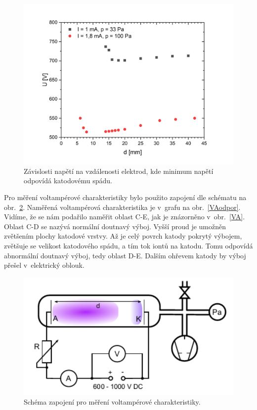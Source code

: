 \documentclass[a4paper,12pt]{article}
\begin{document}
\begin{figure}[h!]
	\centering
	\includegraphics[width=145mm]{KatodovySpad.png}
	\caption{Závislosti napětí na vzdálenosti elektrod, kde minimum napětí odpovídá katodovému spádu.}
	\label{KatodovySpad}
\end{figure}

\newpage
Pro měření voltampérové charakteristiky bylo použito zapojení dle schématu na 
obr.~\ref{schema3}. Naměřená voltampérová charakteristika je v~grafu na 
obr.~\ref{VAodpor}. Vidíme, 
že se nám podařilo naměřit oblast C-E, jak je znázorněno v~obr.~\ref{VA}. 
Oblast C-D se nazývá normální doutnavý výboj. Vyšší proud je umožněn zvětšením 
plochy katodové vrstvy. Až je celý povrch katody pokrytý výbojem, 
zvětšuje 
se velikost katodového spádu, a tím tok iontů na katodu. Tomu odpovídá 
abnormální doutnavý výboj, tedy oblast D-E. Dalším ohřevem katody by výboj 
přešel v~elektrický oblouk.

\begin{figure}[h!]
	\centering
	\includegraphics[width=120mm]{schema3op2.png}
	\caption{Schéma zapojení pro měření voltampérové charakteristiky.}
	\label{schema3}
\end{figure}
\end{document}
